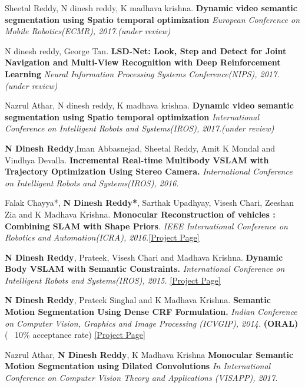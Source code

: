 \documentclass[a4paper,10pt]{article}
\begin{document}
\vspace{-2 mm}
Sheetal Reddy, N dinesh reddy, K madhava krishna. \textbf{Dynamic video semantic segmentation using Spatio temporal
      optimization} {\sl European Conference on Mobile Robotics(ECMR), 2017.(under review)}

N dinesh reddy, George Tan. \textbf{LSD-Net: Look, Step and Detect for Joint Navigation and Multi-View Recognition with Deep Reinforcement Learning} {\sl Neural Information Processing Systems Conference(NIPS), 2017.(under review)}

Nazrul Athar, N dinesh reddy, K madhava krishna. \textbf{Dynamic video semantic segmentation using Spatio temporal
      optimization} {\sl International Conference on Intelligent Robots and Systems(IROS), 2017.(under review)}


\textbf{N Dinesh Reddy},Iman Abbasnejad, Sheetal Reddy,  Amit K Mondal and Vindhya Devalla. \textbf{Incremental Real-time Multibody VSLAM with Trajectory Optimization Using Stereo Camera.} {\sl International Conference on Intelligent Robots and Systems(IROS), 2016.}


Falak Chayya*, \textbf{N Dinesh Reddy*}, Sarthak Upadhyay, Visesh Chari, Zeeshan Zia and K Madhava Krishna. \textbf{Monocular Reconstruction of vehicles : Combining SLAM with Shape Priors}. {\sl IEEE International Conference on Robotics and Automation(ICRA), 2016.}\href{http://robotics.iiit.ac.in/people/falak.chhaya/Monocular_Reconstruction_of_Vehicles.html}{[Project Page]}


\textbf{N Dinesh Reddy}, Prateek, Visesh Chari and Madhava Krishna. \textbf{Dynamic Body VSLAM with Semantic Constraints.} {\sl International Conference on Intelligent Robots and Systems(IROS), 2015.} \href{https://researchweb.iiit.ac.in/~dineshreddy.n/zerotype/projects/DB-VSLAM/}{[Project Page]}


\textbf{N Dinesh Reddy}, Prateek Singhal and K Madhava Krishna. \textbf{Semantic Motion Segmentation Using Dense CRF Formulation.} {\sl Indian Conference on Computer Vision, Graphics and Image Processing (ICVGIP), 2014.} \textbf{(ORAL)} (~ 10\% acceptance rate) \href{https://researchweb.iiit.ac.in/~dineshreddy.n/zerotype/projects/SMS/} {[Project Page]}
 
  Nazrul Athar, \textbf{N Dinesh Reddy}, K Madhava Krishna \textbf{Monocular Semantic Motion Segmentation using Dilated
Convolutions} {\sl In  International Conference on Computer Vision Theory and Applications (VISAPP), 2017.}
\end{document}
